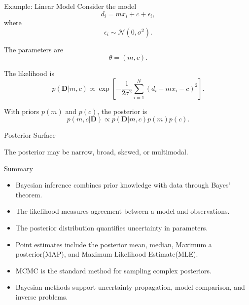\documentclass[a4paper, 10pt, onepage]{elegantbook}
\begin{document}
{\begin{frame}{Example: Linear Model}
  Consider the model
  \[
    d_i=mx_i+c+\epsilon_i,
  \]
  where
  \[
    \epsilon_i\sim\mathcal{N}(0,\sigma^2).
  \]

  The parameters are
  \[
    \theta=(m,c).
  \]

  The likelihood is
  \[
    p(\mathbf{D}|m,c)
    \propto
    \exp\left[
      -\frac{1}{2\sigma^2}
      \sum_{i=1}^{N}
      \left(d_i-mx_i-c\right)^2
    \right].
  \]

  With priors \(p(m)\) and \(p(c)\), the posterior is
  \[
    p(m,c|\mathbf{D})
    \propto
    p(\mathbf{D}|m,c)p(m)p(c).
  \]
\end{frame}

\begin{frame}{Posterior Surface}
  \centering
{}


  \vspace{2mm}
  The posterior may be narrow, broad, skewed, or multimodal.
\end{frame}

\begin{frame}{Summary}
  \begin{itemize}
    \item Bayesian inference combines prior knowledge with data through Bayes' theorem.
    \item The likelihood measures agreement between a model and observations.
    \item The posterior distribution quantifies uncertainty in parameters.
    \item Point estimates include the posterior mean, median, Maximum a posterior(MAP), and Maximum Likelihood 
Estimate(MLE).
    \item MCMC is the standard method for sampling complex posteriors.
    \item Bayesian methods support uncertainty propagation, model comparison, and inverse problems.
  \end{itemize}
\end{frame}

}
\end{document}
